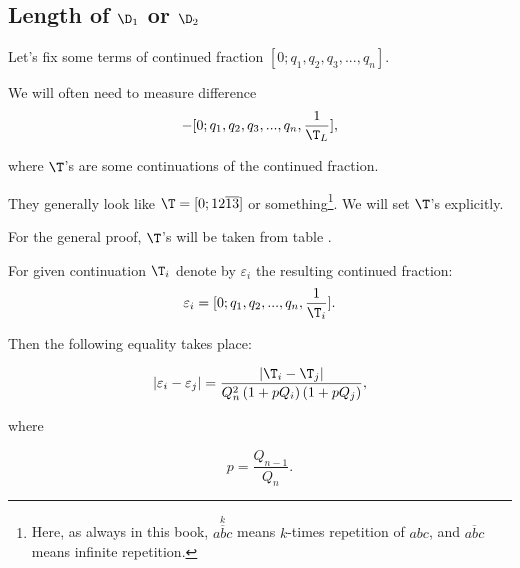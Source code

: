 \subsection{Length of $\D_1$ or $\D_2$}

Let's fix some terms of continued fraction $[0; q_1, q_2, q_3, ..., q_n]$.

We will often need to measure difference
\begin{equation*}
	[0; q_1, q_2, q_3, ..., q_n, \frac{1}{\T_R}] - 
	[0; q_1, q_2, q_3, ..., q_n, \frac{1}{\T_L}],
\end{equation*}

where $\T$'s are some continuations of the continued fraction.

They generally look like $\T = [0;12\overline{13}]$ or something\footnote{%
	Here, as always in this book, $\overset{k}{\overline{abc}}$
	means $k$-times repetition of $abc$,
	and $\overline{abc}$ means infinite repetition.}.
We will set $\T$'s explicitly.

For the general proof, $\T$'s will be taken from table .

\begin{designation}
	For given continuation $\T_i$ denote by $\varepsilon_i$ the resulting continued fraction:
	\begin{equation}\label{epsilon_rule} %
		\varepsilon_i = [0; q_1, q_2, ..., q_n, \frac{1}{\T_i}].
	\end{equation}
\end{designation}

Then the following equality takes place:

\begin{equation}\label{varepsilons_difference} %
	| \varepsilon_i - \varepsilon_j | = 
	\dfrac{| \T_i - \T_j |}
	{Q_n^2 \left(1 + pQ_i\right) \left(1 + pQ_j\right)},
\end{equation}

where

\begin{equation*}
	p = \dfrac{Q_{n-1}}{Q_n}.
\end{equation*}
